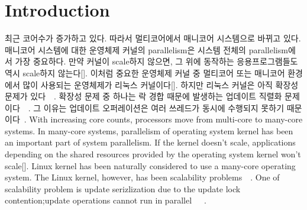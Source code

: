\section{Introduction} \label{sec:introduction}

\ifkor
최근 코어수가 증가하고 있다. 따라서 멀티코어에서 매니코어 시스템으로 바뀌고 있다. 
매니코어 시스템에 대한 운영체제 커널의 parallelism은 시스템 전체의 parallelism에서 가장 중요하다. 
만약 커널이 scale하지 않으면, 그 위에 동작하는 응용프로그램들도 역시 scale하지 않는다[].
이처럼 중요한 운영체제 커널 중 멀티코어 또는 매니코어 환경에서 많이 사용되는 운영체제가 리눅스 커널이다[].
하지만 리눅스 커널은 아직 확장성 문제가
있다~\cite{SilasBoydWickizer2010LinuxScales48}~\cite{Changwoo2016UMSF}.
확장성 문제 중 하나는 락 경합 때문에 발생하는 업데이트 직렬화
문제이다~\cite{Matveev2015RLU}~\cite{Dodds2015SCT}.
그 이유는 업데이트 오퍼레이션은 여러 쓰레드가 동시에 수행되지 못하기
때문이다~\cite{mckenney2011parallel}.
\else
With increasing core counts, processors move from multi-core to many-core
systems.
In many-core systems, parallelism of operating system kernel has been an
important part of system parallelism.
If the kernel doesn’t scale, applications depending on the shared
resources provided by the operating system kernel won’t scale[].
Linux kernel has been naturally considered to use a many-core operating system.
The Linux kernel, however, has been scalability
problems~\cite{SilasBoydWickizer2010LinuxScales48}~\cite{Changwoo2016UMSF}.
One of scalability problem is update serizlization due to the update lock
contention;update operations cannot run in
parallel~\cite{mckenney2011parallel}~\cite{Matveev2015RLU}~\cite{Dodds2015SCT}.
\fi


